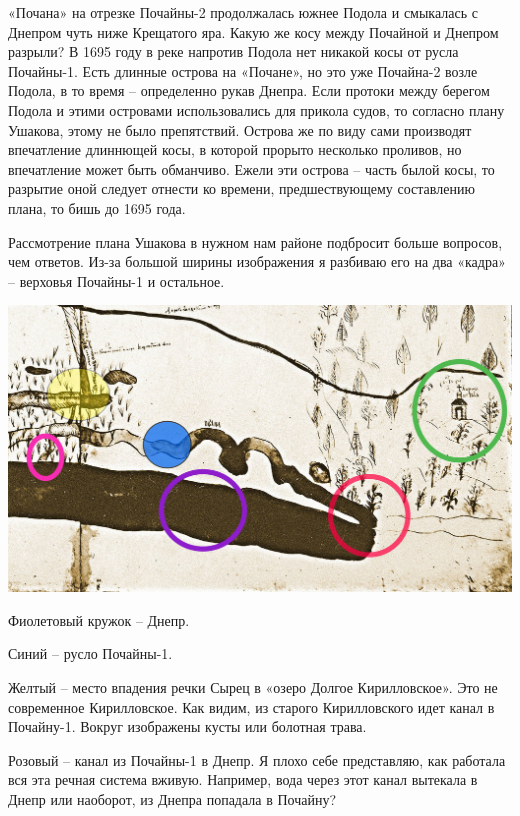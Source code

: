 «Почана» на отрезке Почайны-2 продолжалась южнее Подола и смыкалась с Днепром чуть ниже Крещатого яра. Какую же косу между Почайной и Днепром разрыли? В 1695 году в реке напротив Подола нет никакой косы от русла Почайны-1. Есть длинные острова на «Почане», но это уже Почайна-2 возле Подола, в то время – определенно рукав Днепра. Если протоки между берегом Подола и этими островами использовались для прикола судов, то согласно плану Ушакова, этому не было препятствий. Острова же по виду сами производят впечатление длиннющей косы, в которой прорыто несколько проливов, но впечатление может быть обманчиво. Ежели эти острова – часть былой косы, то разрытие оной следует отнести ко времени, предшествующему составлению плана, то бишь до 1695 года.

Рассмотрение плана Ушакова в нужном нам районе подбросит больше вопросов, чем ответов. Из-за большой ширины изображения я разбиваю его на два «кадра» – верховья Почайны-1 и остальное. 
\vspace*{\fill}
\begin{center}
\includegraphics[width=\linewidth]{chast-colebanie-osnov/pochayna/po1695-p2ist.jpg}
\end{center}
\vspace*{\fill}
\newpage

Фиолетовый кружок – Днепр.

Синий – русло Почайны-1.

Желтый – место впадения речки Сырец в «озеро Долгое Кирилловское». Это не современное Кирилловское. Как видим, из старого Кирилловского идет канал в Почай\-ну-1. Вокруг изображены кусты или болотная трава.

Розовый – канал из Почайны-1 в Днепр. Я плохо себе представляю, как работала вся эта речная система вживую. Например, вода через этот канал вытекала в Днепр или наоборот, из Днепра попадала в Почайну?

